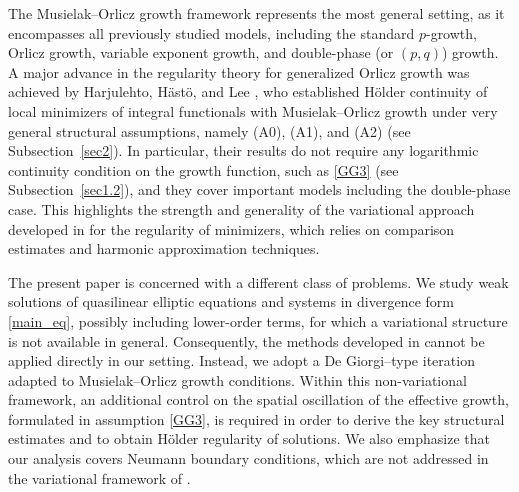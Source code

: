 \documentclass[10pt,reqno]{amsart}
\newcommand *\w{^\wedge}
\theoremstyle{definition}
\numberwithin{equation}{section}
\begin{document}
 The Musielak--Orlicz growth framework represents the most general setting, as it
encompasses all previously studied models, including the standard $p$-growth,
Orlicz growth, variable exponent growth, and double-phase (or $(p,q)$) growth. A major advance in the regularity theory for generalized Orlicz growth was achieved
by Harjulehto, Hästö, and Lee \cite{HHL21}, who established Hölder continuity of
local minimizers of integral functionals with Musielak--Orlicz growth under very
general structural assumptions, namely (A0), (A1), and (A2) (see
Subsection~\ref{sec2}). In particular, their results do not require any logarithmic
continuity condition on the growth function, such as \eqref{GG3} (see
Subsection~\ref{sec1.2}), and they cover important models including the double-phase
case. This highlights the strength and generality of the variational approach
developed in \cite{HHL21} for the regularity of minimizers, which relies on
comparison estimates and harmonic approximation techniques.

The present paper is concerned with a different class of problems. We study weak
solutions of quasilinear elliptic equations and systems in divergence form \eqref{main_eq},
possibly including lower-order terms, for which a variational structure is not
available in general. Consequently, the methods developed in \cite{HHL21} cannot
be applied directly in our setting. Instead, we adopt a De Giorgi--type iteration
adapted to Musielak--Orlicz growth conditions. Within this non-variational
framework, an additional control on the spatial oscillation of the effective
growth, formulated in assumption \eqref{GG3}, is required in order to derive the
key structural estimates and to obtain Hölder regularity of solutions. We also
emphasize that our analysis covers Neumann boundary conditions, which are not
addressed in the variational framework of \cite{HHL21}.
\end{document}
